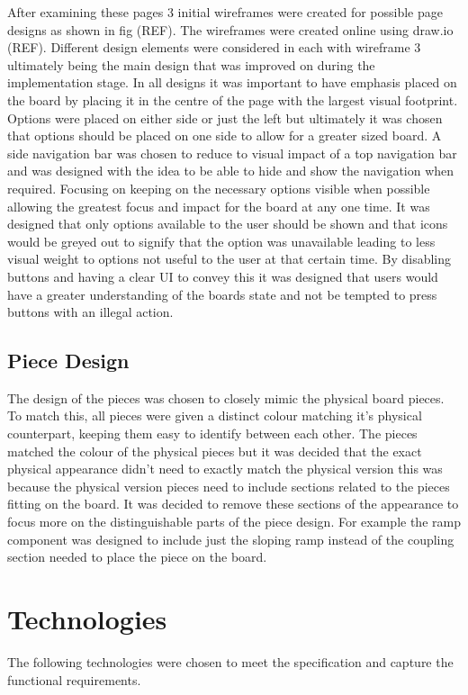 \documentclass{l4proj}
\begin{document}
After examining these pages 3 initial wireframes were created for possible page designs as shown in fig (REF). The wireframes were created online using draw.io (REF). Different design elements were considered in each with wireframe 3 ultimately being the main design that was improved on during the implementation stage. In all designs it was important to have emphasis placed on the board by placing it in the centre of the page with the largest visual footprint. Options were placed on either side or just the left but ultimately it was chosen that options should be placed on one side to allow for a greater sized board. A side navigation bar was chosen to reduce to visual impact of a top navigation bar and was designed with the idea to be able to hide and show the navigation when required. Focusing on keeping on the necessary options visible when possible allowing the greatest focus and impact for the board at any one time. It was designed that only options available to the user should be shown and that icons would be greyed out to signify that the option was unavailable leading to less visual weight to options not useful to the user at that certain time. By disabling buttons and having a clear UI to convey this it was designed that users would have a greater understanding of the boards state and not be tempted to press buttons with an illegal action.


\subsection{Piece Design}
The design of the pieces was chosen to closely mimic the physical board pieces. To match this, all pieces were given a distinct colour matching it's physical counterpart, keeping them easy to identify between each other. The pieces matched the colour of the physical pieces but it was decided that the exact physical appearance didn't need to exactly match the physical version this was because the physical version pieces need to include sections related to the pieces fitting on the board. It was decided to remove these sections of the appearance to focus more on the distinguishable parts of the piece design. For example the ramp component was designed to include just the sloping ramp instead of the coupling section needed to place the piece on the board.

\section{Technologies}
The following technologies were chosen to meet the specification and capture the functional requirements.
\end{document}
